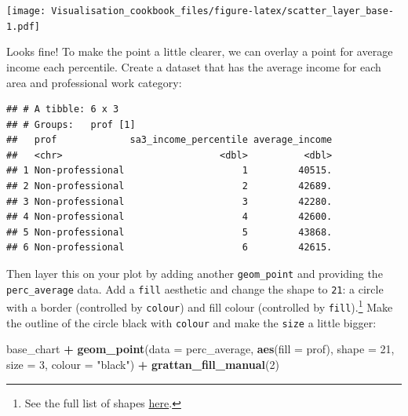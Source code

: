 \documentclass[]{book}
\newenvironment{Shaded}{\begin{snugshade}}{\end{snugshade}}
\newcommand{\DataTypeTok}[1]{\textcolor[rgb]{0.13,0.29,0.53}{#1}}
\newcommand{\DecValTok}[1]{\textcolor[rgb]{0.00,0.00,0.81}{#1}}
\newcommand{\KeywordTok}[1]{\textcolor[rgb]{0.13,0.29,0.53}{\textbf{#1}}}
\newcommand{\NormalTok}[1]{#1}
\newcommand{\OperatorTok}[1]{\textcolor[rgb]{0.81,0.36,0.00}{\textbf{#1}}}
\newcommand{\StringTok}[1]{\textcolor[rgb]{0.31,0.60,0.02}{#1}}
\let\rmarkdownfootnote\footnote%
\def\footnote{\protect\rmarkdownfootnote}
\begin{document}
\texttt{[image: Visualisation\_cookbook\_files/figure-latex/scatter\_layer\_base-1.pdf]}

Looks fine! To make the point a little clearer, we can overlay a point for average income each percentile. Create a dataset that has the average income for each area and professional work category:

\begin{Shaded}
\end{Shaded}

\begin{verbatim}
## # A tibble: 6 x 3
## # Groups:   prof [1]
##   prof             sa3_income_percentile average_income
##   <chr>                            <dbl>          <dbl>
## 1 Non-professional                     1         40515.
## 2 Non-professional                     2         42689.
## 3 Non-professional                     3         42280.
## 4 Non-professional                     4         42600.
## 5 Non-professional                     5         43868.
## 6 Non-professional                     6         42615.
\end{verbatim}

Then layer this on your plot by adding another \texttt{geom\_point} and providing the \texttt{perc\_average} data. Add a \texttt{fill} aesthetic and change the shape to \texttt{21}: a circle with a border (controlled by \texttt{colour}) and fill colour (controlled by \texttt{fill}).\footnote{See the full list of shapes \href{https://ggplot2.tidyverse.org/reference/scale_shape.html}{here}.}
Make the outline of the circle black with \texttt{colour} and make the \texttt{size} a little bigger:

\begin{Shaded}
\begin{Highlighting}[]
\NormalTok{base_chart }\OperatorTok{+}
\StringTok{  }\KeywordTok{geom_point}\NormalTok{(}\DataTypeTok{data =}\NormalTok{ perc_average,}
             \KeywordTok{aes}\NormalTok{(}\DataTypeTok{fill =}\NormalTok{ prof),}
             \DataTypeTok{shape =} \DecValTok{21}\NormalTok{,}
             \DataTypeTok{size =} \DecValTok{3}\NormalTok{, }
             \DataTypeTok{colour =} \StringTok{"black"}\NormalTok{) }\OperatorTok{+}\StringTok{ }
\StringTok{  }\KeywordTok{grattan_fill_manual}\NormalTok{(}\DecValTok{2}\NormalTok{)}
\end{Highlighting}
\end{Shaded}
\end{document}
